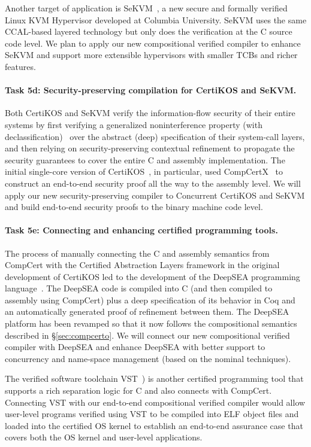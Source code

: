Another target of application is SeKVM~\cite{sekvm21a,sekvm21b,tao21},
a new secure and formally verified Linux KVM Hypervisor developed at
Columbia University. SeKVM uses the same CCAL-based layered technology 
but only does the verification at the C source code level. We plan to
apply our new compositional verified compiler to enhance SeKVM and support
more extensible hypervisors with smaller TCBs and richer features.

\vspace*{-2ex}
\paragraph*{Task 5d: Security-preserving compilation for CertiKOS and SeKVM.}
Both CertiKOS and SeKVM verify the information-flow security of their
entire systems by first verifying a generalized noninterference
property (with declassification)~\cite{costanzo16} over the abstract
(deep) specification of their system-call layers, and then relying on
security-preserving contextual refinement to propagate the security
guarantees to cover the entire C and assembly implementation. The
initial single-core version of CertiKOS~\cite{costanzo16}, in
particular, used CompCertX~\cite{dscal15} to construct an end-to-end
security proof all the way to the assembly level.  We will apply our
new security-preserving compiler to Concurrent CertiKOS and SeKVM and
build end-to-end security proofs to the binary machine code level.

\vspace*{-2ex}
\paragraph*{Task 5e: Connecting and enhancing certified programming tools.}
The process of manually connecting the C and assembly semantics from
CompCert with the Certified Abstraction Layers framework in the
original development of CertiKOS led to the development of the DeepSEA
programming language~\cite{deepsea19}.  The DeepSEA code is compiled
into C (and then compiled to assembly using CompCert) plus a deep
specification of its behavior in Coq and an automatically generated
proof of refinement between them. The DeepSEA platform has been
revamped so that it now follows the compositional semantics described
in \S\ref{sec:compcerto}. We will connect our new compositional
verified compiler with DeepSEA and enhance DeepSEA with better support
to concurrency and name-space management (based on the nominal techniques).

The verified software toolchain VST~\cite{appel11:vst}) is another
certified programming tool that supports a rich separation logic for C
and also connects with CompCert. Connecting VST with our end-to-end
compositional verified compiler would allow user-level programs
verified using VST to be compiled into ELF object files and loaded
into the certified OS kernel to establish an end-to-end assurance case
that covers both the OS kernel and user-level applications.

